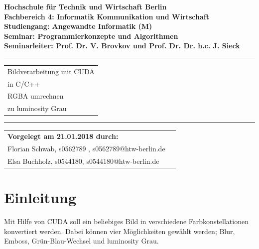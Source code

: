 \documentclass{llncs}
\begin{document}
	\lstset{language=c++, breaklines=true, frame=single}
\thispagestyle{empty}
\begin{flushleft}
\bfseries	Hochschule für Technik und Wirtschaft Berlin\\
	Fachbereich 4: Informatik Kommunikation und Wirtschaft \\
	Studiengang: Angewandte Informatik (M)\\
	Seminar: Programmierkonzepte und Algorithmen\\
	Seminarleiter: Prof. Dr. V. Brovkov und Prof. Dr. Dr. h.c. J. Sieck\\ [2.5cm]
\end{flushleft}
\vspace{45pt}
\rule{\textwidth}{1pt}
\vspace{2pt}
\begin{flushright}
\Huge
\begin{tabular}{@{}l}
Bildverarbeitung mit CUDA\\ in C/C++\\
RGBA umrechnen\\ zu luminosity Grau\\[6pt]

\end{tabular}
\end{flushright}
\rule{\textwidth}{1pt}
\vfill

\begin{flushleft}
\begin{tabular}{ll}
{\bfseries Vorgelegt am 21.01.2018 durch: }\\
Florian Schwab, s0562789 , s0562789@htw-berlin.de \\
Elsa Buchholz, s0544180, s0544180@htw-berlin.de \\
\end{tabular}
\end{flushleft}

%
\newpage
\tableofcontents
\newpage
%
\section{Einleitung}
%
Mit Hilfe von CUDA soll ein beliebiges Bild in verschiedene Farbkonstellationen konvertiert werden. Dabei können vier  Möglichkeiten gewählt werden; Blur, Emboss, Grün-Blau-Wechsel und luminosity Grau.\\
\end{document}
